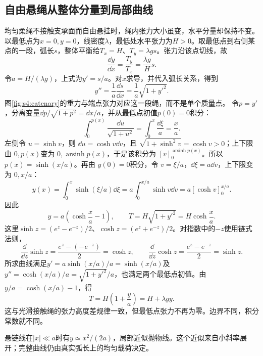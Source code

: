 \subsection{自由悬绳从整体分量到局部曲线}
均匀柔绳不接触支承面而自由悬挂时，绳内张力大小虽变，水平分量却保持不变。以最低点为$x=0,y=0$，线密度$\lambda$，最低处水平张力为$H>0$。取最低点到右侧某点的一段，弧长$s$，整体平衡给$T_x=H$、$T_y=\lambda gs$。张力沿该点切线，故
\[
\frac{\dd y}{\dd x}=\frac{T_y}{T_x}=\frac{\lambda g}{H}s.
\]
令$a=H/(\lambda g)$，上式为$y'=s/a$。对$x$求导，并代入弧长关系，得到
\[
y''=\frac1a\frac{\dd s}{\dd x}
=\frac1a\sqrt{1+y'^2}.
\]
图\ref{fig:s4:catenary}的重力与端点张力对应这一段绳，而不是单个质量点。
令$p=y'$，分离变量$\dd p/\sqrt{1+p^2}=\dd x/a$，并从最低点初值$p(0)=0$积分：
\[\int_0^{p(x)}\frac{\dd u}{\sqrt{1+u^2}}=\int_0^x\frac{\dd\xi}{a}=\frac xa.\]
左侧令 $u=\sinh v$，则 $\dd u=\cosh v\dd v$，且 $\sqrt{1+\sinh^2v}=\cosh v>0$；上下限由 $0,p(x)$变为 $0,\operatorname{arsinh}p(x)$，于是该积分为 $[v]_0^{\operatorname{arsinh}p(x)}$。所以 $p(x)=\sinh(x/a)$。再由 $y(0)=0$积分，令 $v=\xi/a$，$\dd\xi=a\dd v$，上下限变为 $0,x/a$：
\[y(x)=\int_0^x\sinh(\xi/a)\dd\xi
 =a\int_0^{x/a}\sinh v\dd v
 =a[\cosh v]_0^{x/a}.\]
因此
\[
y=a\left(\cosh\frac xa-1\right),\qquad
T=H\sqrt{1+y'^2}=H\cosh\frac xa.
\]
这里$\sinh z=(e^z-e^{-z})/2$、$\cosh z=(e^z+e^{-z})/2$。对指数中的$-z$使用链式法则，
\[
\frac{\dd}{\dd z}\sinh z=\frac{e^z-(-e^{-z})}{2}=\cosh z,
\qquad
\frac{\dd}{\dd z}\cosh z=\frac{e^z-e^{-z}}2=\sinh z.
\]
所求曲线满足$y'=a\sinh(x/a)/a=\sinh(x/a)$及$y''=\cosh(x/a)/a=\sqrt{1+y'^2}/a$，也满足两个最低点初值。由$y/a=\cosh(x/a)-1$，得
\[
T=H\left(1+\frac ya\right)=H+\lambda gy.
\]
这与光滑接触绳的张力高度差规律一致，但最低点张力不再为零。边界不同，积分常数就不同。

悬链线在$|x|\ll a$时有$y\simeq x^2/(2a)$，局部近似抛物线。这个近似来自小斜率展开；完整曲线仍由真实弧长上的均匀载荷决定。

